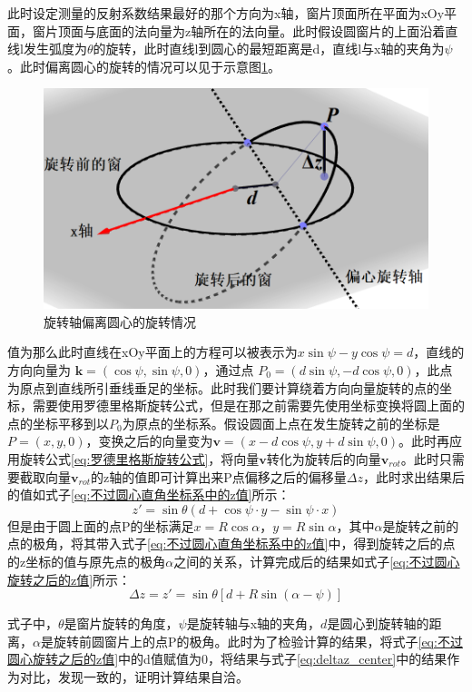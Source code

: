 \documentclass[master]{thesis-uestc}
\begin{document}
此时设定测量的反射系数结果最好的那个方向为x轴，窗片顶面所在平面为xOy平面，窗片顶面与底面的法向量为z轴所在的法向量。此时假设圆窗片的上面沿着直线l发生弧度为\(\theta\)的旋转，此时直线l到圆心的最短距离是d，直线l与x轴的夹角为\(\psi\)。此时偏离圆心的旋转的情况可以见于示意图\ref{fig:旋转轴偏离圆心的旋转情况}。
\begin{figure}[!htb]
    \centering
    \includegraphics[width=0.5\linewidth]{pic/chapter5/不过圆心旋转示意图.png}
    \caption{旋转轴偏离圆心的旋转情况}
    \label{fig:旋转轴偏离圆心的旋转情况}
\end{figure}

值为那么此时直线在xOy平面上的方程可以被表示为\(x \sin \psi - y \cos \psi = d\)，直线的方向向量为 \(\mathbf{k} = (\cos \psi, \sin \psi, 0)\)，通过点 \(P_0 = (d \sin\psi, -d\cos\psi , 0)\)，此点为原点到直线所引垂线垂足的坐标。此时我们要计算绕着方向向量旋转的点的坐标，需要使用罗德里格斯旋转公式，但是在那之前需要先使用坐标变换将圆上面的点的坐标平移到以\(P_0\)为原点的坐标系。假设圆面上点在发生旋转之前的坐标是\(P = (x,y,0)\)，变换之后的向量变为\(\mathbf{v} = (x - d\cos\psi, y + d\sin\psi, 0)\)。此时再应用旋转公式\ref{eq:罗德里格斯旋转公式}，将向量\(\mathbf{v}\)转化为旋转后的向量\(\mathbf{v}_{rot}\)。此时只需要截取向量\(\mathbf{v}_{rot}\)的z轴的值即可计算出来P点偏移之后的偏移量\(\Delta z\)，此时求出结果后的值如式子\ref{eq:不过圆心直角坐标系中的z值}所示：
\begin{equation}\label{eq:不过圆心直角坐标系中的z值}
    z' = \sin \theta \left(d + \cos\psi \cdot y - \sin\psi \cdot x \right)
\end{equation}
但是由于圆上面的点P的坐标满足\(x = R\cos\alpha\)，\(y = R\sin\alpha\)，其中\(\alpha\)是旋转之前的点的极角，将其带入式子\ref{eq:不过圆心直角坐标系中的z值}中，得到旋转之后的点的z坐标的值与原先点的极角\(\alpha\)之间的关系，计算完成后的结果如式子\ref{eq:不过圆心旋转之后的z值}所示：
\begin{equation}\label{eq:不过圆心旋转之后的z值}
    \Delta z = z' = \sin \theta \left[d+R \sin (\alpha -\psi )\right]
\end{equation}

式子中，\(\theta\)是窗片旋转的角度，\(\psi\)是旋转轴与x轴的夹角，\(d\)是圆心到旋转轴的距离，\(\alpha\)是旋转前圆窗片上的点P的极角。此时为了检验计算的结果，将式子\ref{eq:不过圆心旋转之后的z值}中的d值赋值为0，将结果与式子\ref{eq:deltaz_center}中的结果作为对比，发现一致的，证明计算结果自洽。
\end{document}
